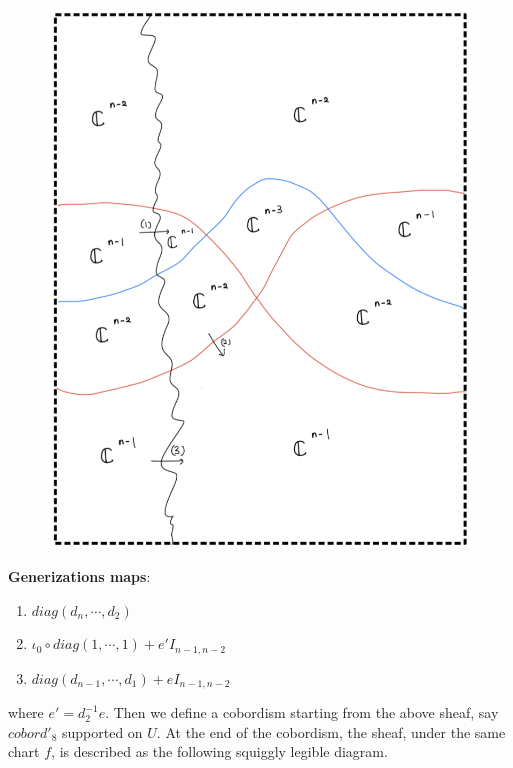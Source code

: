 \begin{figure}[H]
    \centering
    \includegraphics[scale = 0.85]{diagrams/cobord'8/1.png}
    \caption{}
    \label{fig:your-label}
\end{figure}
\textbf{Generizations maps}:
\begin{enumerate}[label = (\arabic*)]
\item $diag(d_n,\cdots,d_2)$
\item $\iota_0 \circ diag(1,\cdots,1) + e'I_{n-1,n-2}$
\item $diag(d_{n-1},\cdots,d_1) + eI_{n-1,n-2}$
\end{enumerate}
where $e' = d_2^{-1}e$. Then we define a cobordism starting from the above sheaf, say $cobord'_8$ supported on $U$. At the end of the cobordism, the sheaf, under the same chart $f$, is described as the following squiggly legible diagram. 
